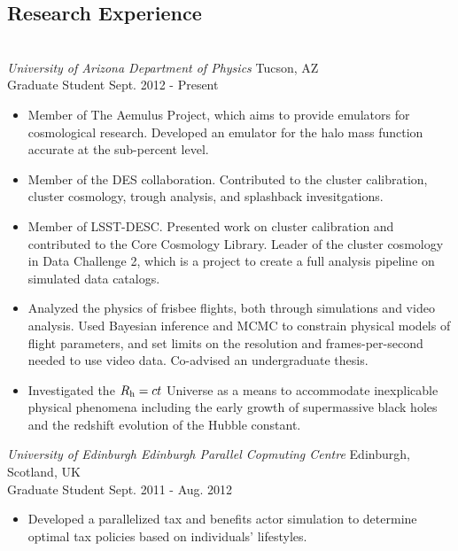 \documentclass{res}
\begin{document}
\begin{resume}
\section{Research Experience} 
\vspace{-8pt}
\hrulefill\\
{\sl University of Arizona Department of Physics} \hfill Tucson, AZ\\
Graduate Student \hfill Sept. 2012 - Present
\begin{itemize} \itemsep -2pt %
  \item Member of The Aemulus Project, which aims to provide emulators for cosmological research. Developed an emulator for the halo mass function accurate at the sub-percent level.
  \item Member of the DES collaboration. Contributed to the cluster calibration, cluster cosmology, trough analysis, and splashback invesitgations.%
  \item Member of LSST-DESC. Presented work on cluster calibration and contributed to the Core Cosmology Library. Leader of the cluster cosmology in Data Challenge 2, which is a project to create a full analysis pipeline on simulated data catalogs.
  \item Analyzed the physics of frisbee flights, both through simulations and video analysis. Used Bayesian inference and MCMC to constrain physical models of flight parameters, and set limits on the resolution and frames-per-second needed to use video data. Co-advised an undergraduate thesis.%
  \item Investigated the $R_{\rm h}=ct$ Universe as a means to accommodate inexplicable physical phenomena including the early growth of supermassive black holes and the redshift evolution of the Hubble constant.%
\end{itemize}

{\sl University of Edinburgh Edinburgh Parallel Copmuting Centre} \hfill Edinburgh, Scotland, UK\\
Graduate Student \hfill Sept. 2011 - Aug. 2012
\begin{itemize} \itemsep -2pt %
   \item  Developed a parallelized tax and benefits actor simulation to determine optimal tax policies based on individuals' lifestyles.
\end{itemize}


\end{resume}
\end{document}

